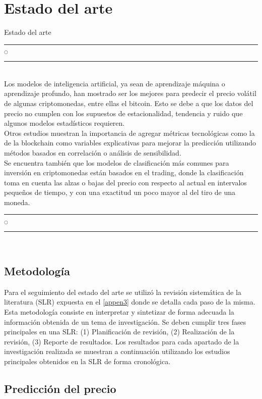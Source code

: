 \chapter[Estado del arte]{Estado del arte}{Estado del arte}\label{estado_arte}
\renewcommand{\tablename}{Tabla}

\noindent
\rule{0.49\textwidth}{0.75pt} $_{\bigcirc}$ \rule{0.49\textwidth}{0.75pt}\\

Los modelos de inteligencia artificial, ya sean de aprendizaje máquina o aprendizaje profundo, han mostrado ser los mejores para predecir el precio volátil de algunas criptomonedas, entre ellas el bitcoin. Esto se debe a que los datos del precio no cumplen con los supuestos de estacionalidad, tendencia y ruido que algunos modelos estadísticos requieren.\\
Otros estudios muestran la importancia de agregar métricas tecnológicas como la de la blockchain como variables explicativas para mejorar la predicción utilizando métodos basados en correlación o análisis de sensibilidad.\\
Se encuentra también que los modelos de clasificación más comunes para inversión en criptomonedas están basados en el trading, donde la clasificación toma en cuenta las alzas o bajas del precio con respecto al actual en intervalos pequeños de tiempo, y con una exactitud un poco mayor al del tiro de una moneda.\\

\noindent
\rule{0.49\textwidth}{0.75pt} $_{\bigcirc}$ \rule{0.49\textwidth}{0.75pt}\\
\clearpage

\section{Metodología} 

Para el seguimiento del estado del arte se utilizó la revisión sistemática de la literatura (SLR) expuesta en el \cref{appen3} donde se detalla cada paso de la misma. Esta metodología consiste en interpretar y sintetizar de forma adecuada la información obtenida de un tema de investigación. Se deben cumplir tres fases principales en una SLR: (1) Planificación de revisión, (2) Realización de la revisión, (3) Reporte de resultados. Los resultados para cada apartado de la investigación realizada se muestran a continuación utilizando los estudios principales obtenidos en la SLR de forma cronológica.

\section{Predicción del precio}

